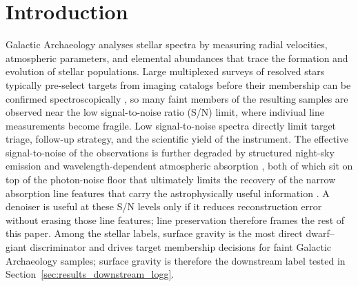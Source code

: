 \documentclass[twocolumn]{aastex7}
\begin{document}
\section{Introduction}
\label{sec:introduction}
Galactic Archaeology analyses stellar spectra by measuring radial velocities, atmospheric parameters, and elemental abundances that trace the formation and evolution of stellar populations. Large multiplexed surveys of resolved stars typically pre-select targets from imaging catalogs before their membership can be confirmed spectroscopically \citep{Dey2019_LegacySurveys,Majewski2017_APOGEE}, so many faint members of the resulting samples are observed near the low signal-to-noise ratio (S/N) limit, where indiviual line measurements become fragile. Low signal-to-noise spectra directly limit target triage, follow-up strategy, and the scientific yield of the instrument. The effective signal-to-noise of the observations is further degraded by structured night-sky emission and wavelength-dependent atmospheric absorption \citep{Osterbrock1996_SkyAtlas,Hanuschik2003_SkyAtlas,Noll2012_ParanalSky}, both of which sit on top of the photon-noise floor that ultimately limits the recovery of the narrow absorption line features that carry the astrophysically useful information \citep{Bouchy2001_RVLimit}. A denoiser is useful at these S/N levels only if it reduces reconstruction error without erasing those line features; line preservation therefore frames the rest of this paper. Among the stellar labels, surface gravity is the most direct dwarf--giant discriminator and drives target membership decisions for faint Galactic Archaeology samples; surface gravity is therefore the downstream label tested in Section~\ref{sec:results_downstream_logg}.
\end{document}
